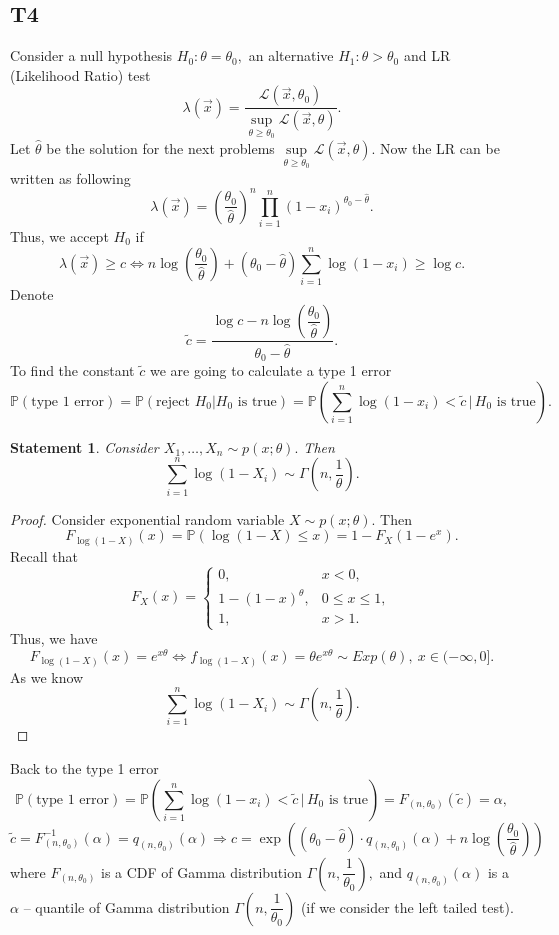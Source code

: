 \documentclass[a4paper, 12pt]{article}
\renewcommand*{\P}{\mathbb{P}}
\newtheorem{statement}{Statement}
\begin{document}
\subsection{T4}
Consider a null hypothesis $H_0: \theta = \theta_0,$ an alternative $H_1: \theta > \theta_0$ and LR (Likelihood Ratio) test
$$
\lambda(\vec{x}) = \dfrac{\mathcal{L}(\vec{x}, \theta_0)}{\sup \limits_{\theta \geqslant \theta_0} \mathcal{L}(\vec{x}, \theta)}.
$$
Let $\hat{\theta}$ be the solution for the next problems $\sup \limits_{\theta \geqslant \theta_0} \mathcal{L}(\vec{x}, \theta).$ Now the LR can be written as following
$$
\lambda(\vec{x}) = \left( \dfrac{\theta_0}{\hat{\theta}} \right)^n \prod \limits_{i=1}^n (1-x_i)^{\theta_0- \hat{\theta}}.
$$
Thus, we accept $H_0$ if 
$$
\lambda(\vec{x}) \geqslant c \Leftrightarrow n \log \left(\dfrac{\theta_0}{\hat{\theta}} \right) + (\theta_0 - \hat{\theta}) \sum \limits_{i=1}^n \log (1 - x_i) \geqslant \log c. 
$$
Denote $$
\widetilde{c} = \dfrac{ \log c - n \log \left(\dfrac{\theta_0}{\hat{\theta}} \right)}{\theta_0 - \hat{\theta}}.
$$
To find the constant $\widetilde{c}$ we are going to calculate a type 1 error
$$ 
\P(\text{type 1 error}) = \P (\text{reject } H_0| H_0 \text{ is true}) = \P \left( \sum \limits_{i=1}^n \log (1 - x_i) < \widetilde{c} \, | \, H_0 \text{ is true} \right).
$$
\begin{statement}
Consider $X_1, \ldots, X_n \sim p(x;\theta).$ Then
$$
\sum \limits_{i=1}^n \log (1 - X_i) \sim \Gamma \left( n, \dfrac{1}{\theta} \right).
$$
\end{statement}
\begin{proof}
Consider exponential random variable $X \sim p(x; \theta).$ Then
$$
F_{\log(1-X)}(x) = \P (\log(1 - X) \leqslant x) = 1 - F_X(1 - e^x).
$$
Recall that
$$
F_X(x) = 
\begin{cases}
0, & x < 0, \\
1 - (1 - x)^{\theta}, & 0 \leqslant x \leqslant 1, \\
1, & x > 1.
\end{cases}
$$
Thus, we have
$$
F_{\log(1-X)}(x) = e^{x \theta} \Leftrightarrow f_{\log(1-X)}(x) = \theta e^{x \theta} \sim Exp(\theta), ~ x \in ( -\infty, 0].
$$
As we know 
$$
\sum \limits_{i=1}^n \log (1 - X_i) \sim \Gamma \left( n, \dfrac{1}{\theta} \right).
$$
\end{proof}
\noindent Back to the type 1 error
$$ 
\P(\text{type 1 error}) = \P \left( \sum \limits_{i=1}^n \log (1 - x_i) < \widetilde{c} \, | \, H_0 \text{ is true} \right) = F_{(n, \theta_0)}(\widetilde{c}) = \alpha,
$$
$$
\widetilde{c} = F_{(n, \theta_0)}^{-1}(\alpha) = q_{(n, \theta_0)}(\alpha) \Rightarrow c = \exp \left( (\theta_0 - \hat{\theta}) \cdot q_{(n, \theta_0)}(\alpha) + n \log \left( \dfrac{\theta_0}{\hat{\theta}} \right) \right)
$$
where $F_{(n, \theta_0)}$ is a CDF of Gamma distribution $\Gamma \left( n, \dfrac{1}{\theta_0} \right),$ and $q_{(n, \theta_0)}(\alpha)$ is a $\alpha$ -- quantile of Gamma distribution $\Gamma \left( n, \dfrac{1}{\theta_0} \right)$ (if we consider the left tailed test).\\
\end{document}
